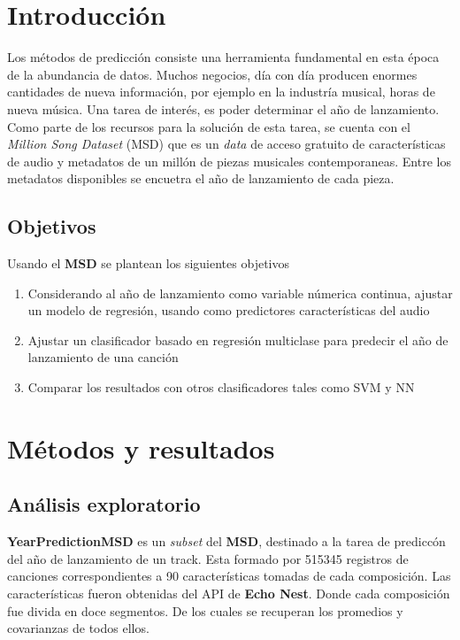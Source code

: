 \documentclass[conference,final,]{IEEEtran}
\begin{document}
\hypertarget{introduccion}{%
\section{Introducción}\label{introduccion}}

Los métodos de predicción consiste una herramienta fundamental en esta
época de la abundancia de datos. Muchos negocios, día con día producen
enormes cantidades de nueva información, por ejemplo en la industría
musical, horas de nueva música. Una tarea de interés, es poder
determinar el año de lanzamiento. Como parte de los recursos para la
solución de esta tarea, se cuenta con el \emph{Million Song Dataset}
(MSD) que es un \emph{data} de acceso gratuito de características de
audio y metadatos de un millón de piezas musicales contemporaneas. Entre
los metadatos disponibles se encuetra el año de lanzamiento de cada
pieza.

\hypertarget{objetivos}{%
\subsection{Objetivos}\label{objetivos}}

Usando el \textbf{MSD} se plantean los siguientes objetivos

\begin{enumerate}
\def\labelenumi{\arabic{enumi}.}
\item
  Considerando al año de lanzamiento como variable númerica continua,
  ajustar un modelo de regresión, usando como predictores
  características del audio
\item
  Ajustar un clasificador basado en regresión multiclase para predecir
  el año de lanzamiento de una canción
\item
  Comparar los resultados con otros clasificadores tales como SVM y NN
\end{enumerate}

\hypertarget{metodos-y-resultados}{%
\section{Métodos y resultados}\label{metodos-y-resultados}}

\hypertarget{analisis-exploratorio}{%
\subsection{Análisis exploratorio}\label{analisis-exploratorio}}

\textbf{YearPredictionMSD} es un \emph{subset} del \textbf{MSD},
destinado a la tarea de prediccón del año de lanzamiento de un track.
Esta formado por 515345 registros de canciones correspondientes a 90
características tomadas de cada composición. Las características fueron
obtenidas del API de \textbf{Echo Nest}. Donde cada composición fue
divida en doce segmentos. De los cuales se recuperan los promedios y
covarianzas de todos ellos.
\end{document}
